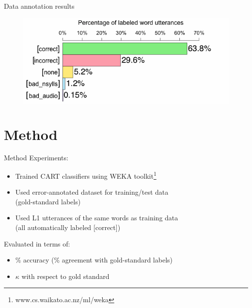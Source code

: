 \documentclass[xcolor={dvipsnames}]{beamer}
\begin{document}
\begin{frame}{Data annotation results}

	\begin{figure}
		\centering
		\includegraphics[width=\textwidth]{../overallJudgments-withLabels}
		\label{fig:results:overallbars}
	\end{figure}
\end{frame}

\section{Method}

\begin{frame}{Method}
		Experiments:
		\begin{itemize}
		\item Trained CART classifiers using WEKA toolkit\footnote{www.cs.waikato.ac.nz/ml/weka}
		\item Used error-annotated dataset for training/test data\\(gold-standard labels)
		\item Used L1 utterances of the same words as training data \\(all automatically labeled [correct])
		\end{itemize}
		
		\vfill
		
		Evaluated in terms of:
		\begin{itemize}
		\item \% accuracy (\% agreement with gold-standard labels) 
		\item $\kappa$ with respect to gold standard
		\end{itemize}
		
		\end{frame}
		
\end{document}
